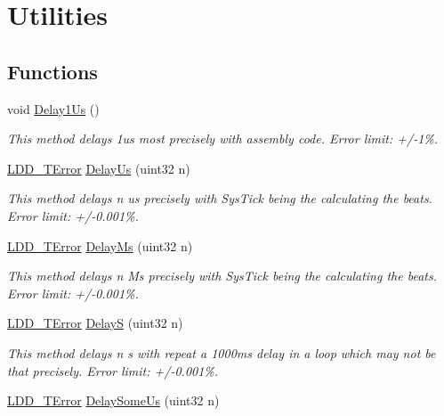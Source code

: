 \hypertarget{group___uti}{\section{Utilities}
\label{group___uti}
}
\subsection*{Functions}
\begin{DoxyCompactItemize}
\item 
void \hyperlink{group___uti_ga0e9be11e405b65adc4e2da665356693b}{Delay1\-Us} ()
\begin{DoxyCompactList}\small\item\em This method delays 1us most precisely with assembly code. Error limit\-: +/-\/1\%. \end{DoxyCompactList}\item 
\hyperlink{group___p_e___types__module_ga24c2b045fd04e79e85f261ce4df35588}{L\-D\-D\-\_\-\-T\-Error} \hyperlink{group___uti_ga75f8e7437f833a92c1b0b47ded4ee3d7}{Delay\-Us} (uint32 n)
\begin{DoxyCompactList}\small\item\em This method delays n us precisely with Sys\-Tick being the calculating the beats. Error limit\-: +/-\/0.001\%. \end{DoxyCompactList}\item 
\hyperlink{group___p_e___types__module_ga24c2b045fd04e79e85f261ce4df35588}{L\-D\-D\-\_\-\-T\-Error} \hyperlink{group___uti_gae6595d8b5c3351b857f86516fa753194}{Delay\-Ms} (uint32 n)
\begin{DoxyCompactList}\small\item\em This method delays n Ms precisely with Sys\-Tick being the calculating the beats. Error limit\-: +/-\/0.001\%. \end{DoxyCompactList}\item 
\hyperlink{group___p_e___types__module_ga24c2b045fd04e79e85f261ce4df35588}{L\-D\-D\-\_\-\-T\-Error} \hyperlink{group___uti_ga57c57c7cdd7316581e674de7f51c1d88}{Delay\-S} (uint32 n)
\begin{DoxyCompactList}\small\item\em This method delays n s with repeat a 1000ms delay in a loop which may not be that precisely. Error limit\-: +/-\/0.001\%. \end{DoxyCompactList}\item 
\hyperlink{group___p_e___types__module_ga24c2b045fd04e79e85f261ce4df35588}{L\-D\-D\-\_\-\-T\-Error} \hyperlink{group___uti_gadfeab0efcdcc155ec9f5692f87a2a57a}{Delay\-Some\-Us} (uint32 n)

\end{DoxyCompactItemize}
